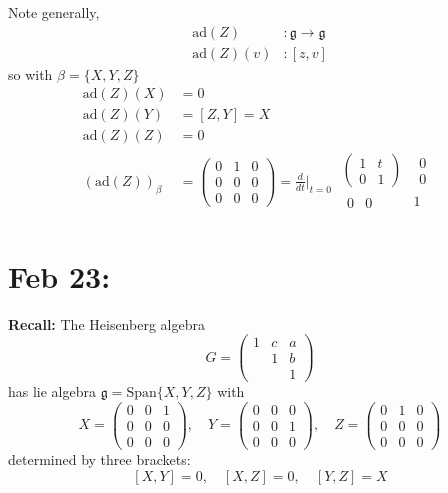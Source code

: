 \documentclass[12pt]{article}
\newcommand{\g}{\mathfrak{g}}
\begin{document}
\begin{itemize}
        Note generally, 
        \begin{align*}
            \text{ad}(Z) &: \g \to \g\\ 
            \text{ad}(Z)(v)&: [z, v]
        \end{align*}
        so with $\beta = \{X, Y, Z\}$ 
        \begin{align*}
            \text{ad}(Z)(X) &= 0\\ 
            \text{ad}(Z)(Y) &= [Z, Y] = X\\ 
            \text{ad}(Z)(Z) &= 0\\ 
            (\text{ad}(Z))_{\beta} &= \begin{pmatrix}
                0 & 1 & 0\\ 
                0 & 0 & 0\\
                0 & 0 & 0
            \end{pmatrix} = \frac{d}{dt}\bigg\vert_{t=0}\; \begin{array}{c|c}
                \begin{pmatrix}
                    1 & t\\
                    0 & 1
                \end{pmatrix} & \begin{matrix}
                    0\\ 0
                \end{matrix}\\ 
                \hline 
                \begin{matrix}
                    0 & 0
                \end{matrix} & 1
            \end{array}
        \end{align*}
    \end{itemize}

\section{Feb 23:} 
    \textbf{Recall:} The Heisenberg algebra 
    \[G = \begin{pmatrix}
        1 & c & a\\ 
        & 1 & b\\
        & & 1
    \end{pmatrix}\]
    has lie algebra $\g = \text{Span}\{X, Y, Z\}$ with 
    \[X = \begin{pmatrix}
        0 & 0 & 1\\ 
        0 & 0 & 0\\ 
        0 & 0 & 0
    \end{pmatrix}, \quad Y = \begin{pmatrix}
        0 & 0 & 0\\ 
        0 & 0 & 1\\ 
        0 & 0 & 0
    \end{pmatrix}, \quad Z = \begin{pmatrix}
        0 & 1 & 0\\ 
        0 & 0 & 0\\ 
        0 & 0 & 0
    \end{pmatrix}\]
    determined by three brackets:
    \[[X, Y] = 0, \quad [X, Z] = 0, \quad [Y, Z] = X\]
\end{document}
